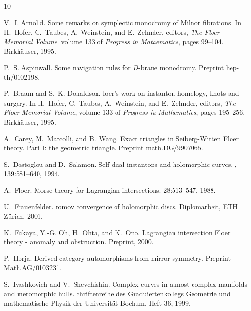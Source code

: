 \documentclass[10pt,letterpaper]{article}
\begin{document}
%
\small
%
%

\begin{thebibliography}{10}

V.~I. Arnol'd.
\newblock Some remarks on symplectic monodromy of {M}ilnor fibrations.
\newblock In H.~Hofer, C.~Taubes, A.~Weinstein, and E.~Zehnder, editors, {\em
  The {F}loer Memorial Volume}, volume 133 of {\em Progress in Mathematics},
  pages 99--104. Birkh{\"a}user, 1995.

P.~S. Aspinwall.
\newblock Some navigation rules for {$D$}-brane monodromy.
\newblock Preprint hep-th/0102198.

P.~Braam and S.~K. Donaldson.
loer's work on instanton homology, knots and surgery.
\newblock In H.~Hofer, C.~Taubes, A.~Weinstein, and E.~Zehnder, editors, {\em
  The {F}loer Memorial Volume}, volume 133 of {\em Progress in Mathematics},
  pages 195--256. Birkh{\"a}user, 1995.

A.~Carey, M.~Marcolli, and B.~Wang.
\newblock Exact triangles in {S}eiberg-{W}itten {F}loer theory. {P}art {I}: the
  geometric triangle.
\newblock Preprint math.DG/9907065.

S.~Dostoglou and D.~Salamon.
\newblock Self dual instantons and holomorphic curves.
, 139:581--640, 1994.

A.~Floer.
\newblock Morse theory for {L}agrangian intersections.
 28:513--547, 1988.

U.~Frauenfelder.
romov convergence of holomorphic discs.
\newblock Diplomarbeit, ETH Z{\"u}rich, 2001.

K.~Fukaya, Y.-G. Oh, H.~Ohta, and K.~Ono.
\newblock Lagrangian intersection {F}loer theory - anomaly and obstruction.
\newblock Preprint, 2000.

P.~Horja.
\newblock Derived category automorphisms from mirror symmetry.
\newblock Preprint Math.AG/0103231.

S.~Ivashkovich and V.~Shevchishin.
\newblock Complex curves in almost-complex manifolds and meromorphic hulls.
chriftenreihe des {G}raduiertenkollegs {G}eometrie und
  mathematische {P}hysik der {U}niversit{\"a}t {B}ochum, {H}eft 36, 1999.


\end{thebibliography}
\end{document}

